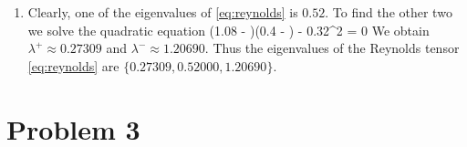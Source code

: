 \documentclass[11pt]{article}
\begin{document}
\begin{enumerate}[label=(\alph*)]
    \item Clearly, one of the eigenvalues of \eqref{eq:reynolds} is $0.52$. To find the other two we solve the quadratic equation
        \beq
            (1.08 - \lambda)(0.4 - \lambda) - 0.32^2 = 0\per
        \eeq
        We obtain $\lambda^+ \approx 0.27309$ and $\lambda^- \approx 1.20690$. Thus the eigenvalues of the Reynolds tensor   \eqref{eq:reynolds}  are $\{0.27309, 0.52000,  1.20690\}$.

\end{enumerate}

\section*{Problem 3}

\begin{enumerate}[label=(\alph*)]
    

\end{enumerate}
\end{document}
